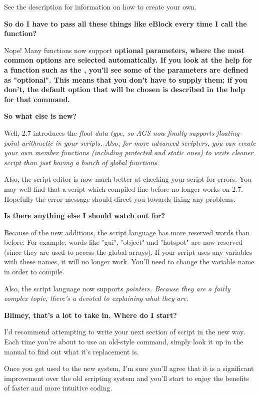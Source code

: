 See the  description for information on how to create your own.

\bf{So do I have to pass all these things like eBlock every time I call the function?}

Nope! Many functions now support \bf{optional parameters}, where the most common options
are selected automatically. If you look at the help for a function such as the
, you'll see some of the parameters
are defined as "optional". This means that you don't have to supply them; if you don't,
the default option that will be chosen is described in the help for that command.

\bf{So what else is new?}

Well, 2.7 introduces the \it{float} data type, so AGS now finally supports floating-point
arithmetic in your scripts. Also, for more advanced scripters, you can create your own
member functions (including protected and static ones) to write cleaner script than just
having a bunch of global functions.

Also, the script editor is now much better at checking your script for errors. You may
well find that a script which compiled fine before no longer works on 2.7. Hopefully
the error message should direct you towards fixing any problems.

\bf{Is there anything else I should watch out for?}

Because of the new additions, the script language has more reserved words than before. For
example, words like "gui", "object" and "hotspot" are now reserved (since they are used
to access the global arrays). If your script uses any variables with these names, it will
no longer work. You'll need to change the variable name in order to compile.

Also, the script language now supports \it{pointers}. Because they are a fairly
complex topic, there's a  devoted to explaining what
they are.

\bf{Blimey, that's a lot to take in. Where do I start?}

I'd recommend attempting to write your next section of script in the new way. Each time
you're about to use an old-style command, simply look it up in the manual to find out
what it's replacement is.

Once you get used to the new system, I'm sure you'll agree that it is a significant
improvement over the old scripting system and you'll start to enjoy the benefits of
faster and more intuitive coding.

